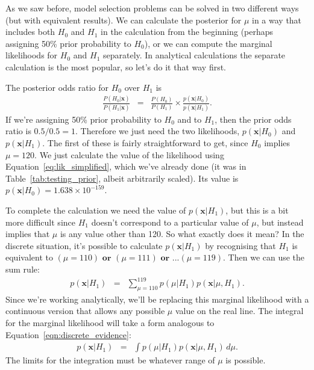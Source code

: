 As we saw before, model selection problems can be solved in two different ways
(but with equivalent results). We can calculate the posterior for $\mu$ in
a way that includes both $H_0$ and $H_1$ in the calculation from the beginning
(perhaps assigning 50\% prior probability to $H_0$), or we can compute the
marginal likelihoods for $H_0$ and $H_1$ separately. In analytical calculations
the separate calculation is the most popular, so let's do it that way first.

The posterior odds ratio for $H_0$ over $H_1$ is
\begin{eqnarray}
\frac{P(H_0 | \boldsymbol{x})}{P(H_1|\boldsymbol{x})} &=& \frac{P(H_0)}{P(H_1)} \times
\frac{p(\boldsymbol{x}|H_0)}{p(\boldsymbol{x}|H_1)}\label{eq:odds_form2}.
\end{eqnarray}
If we're assigning 50\% prior probability to $H_0$ and to $H_1$, then the
prior odds ratio is $0.5 / 0.5 = 1$. Therefore we just need the two likelihoods,
$p(\boldsymbol{x} | H_0)$ and $p(\boldsymbol{x} | H_1)$. The first of these is fairly straightforward to
get, since $H_0$ implies $\mu = 120$. We just calculate the value of the
likelihood using Equation~\ref{eq:lik_simplified}, which we've already done
(it was in Table~\ref{tab:testing_prior}, albeit arbitrarily scaled). Its value
is $p(\boldsymbol{x} | H_0) = 1.638 \times 10^{-159}$.

To complete the calculation we need the value of $p(\boldsymbol{x}|H_1)$, but
this is a bit more difficult since $H_1$ doesn't correspond to a particular
value of $\mu$, but instead implies that $\mu$ is any value other than 120.
So what exactly does it mean? In the discrete situation, it's possible to
calculate $p(\boldsymbol{x}|H_1)$ by recognising that $H_1$ is equivalent to
$(\mu = 110) \textbf{ or } (\mu = 111) \textbf{ or }... (\mu = 119)$. Then
we can use the sum rule:
\begin{eqnarray}
p(\boldsymbol{x}|H_1) &=& \sum_{\mu=110}^{119} p(\mu | H_1)
p(\boldsymbol{x}|\mu, H_1).\label{eqn:discrete_evidence}
\end{eqnarray}
Since we're working analytically, we'll be replacing this marginal likelihood
with a continuous version that allows any possible $\mu$ value on the real line.
The integral for the marginal likelihood will take a form analogous to
Equation~\ref{eqn:discrete_evidence}:
\begin{eqnarray}
p(\boldsymbol{x}|H_1) &=& \int p(\mu | H_1)
p(\boldsymbol{x}|\mu, H_1) \, d\mu.\label{eqn:continuous_evidence}
\end{eqnarray}
The limits for the integration must be whatever range of $\mu$ is possible.

